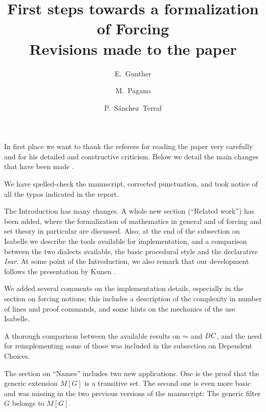 \documentclass[11pt,english]{article}
\begin{document}
\title{First steps towards a formalization of Forcing
  \\ Revisions made to the paper}
\author{E.~Gunther \and  M.~Pagano \and P.~S\'anchez~Terraf
}
\date{}
\maketitle

In first place we want to thank the referees for reading the paper very
carefully and for his detailed and constructive criticism. Below we
detail the main changes that have been made%
.

We have spelled-check the manuscript, corrected punctuation, and took
notice of all the typos indicated in the report. 

The Introduction has many changes. A whole new section (``Related
work'') has been added, where the formalization of mathematics in
general and of forcing and set theory in particular are discussed.
Also, at the end of the subsection on Isabelle we describe the tools
available for implementation, and a comparison
between the two dialects available, the basic procedural style and the
declarative \emph{Isar}. At some point of the Introduction, we also
remark that our 
development follows the presentation by Kunen \cite{kunen2011set}. 

We added several comments on the implementation details, especially in
the section on forcing notions; this includes a description of the
complexity in number of lines and proof commands, and some hints on
the mechanics of the use Isabelle.

A thorough comparison between the available results on $\AC$ and
$\mathit{DC}$, and the need for reimplementing some of those was included in
the subsection on Dependent Choices.

The section on ``Names'' includes two new applications. One is the
proof that the generic
extension $M[G]$ is a transitive set. The second one is even more basic  and
was missing in the two previous versions of the manuscript: The
generic filter $G$ belongs to $M[G]$. 
%
%


\end{document}
